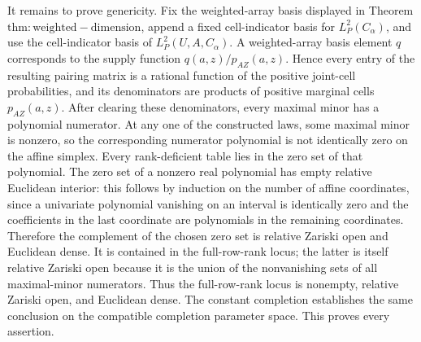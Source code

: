 It remains to prove genericity. Fix the weighted-array basis displayed in Theorem \(\mathrm{thm:weighted-dimension}\), append a fixed cell-indicator basis for \(L_P^2(C_\alpha)\), and use the cell-indicator basis of \(L_P^2(U,A,C_\alpha)\). A weighted-array basis element \(q\) corresponds to the supply function \(q(a,z)/p_{AZ}(a,z)\). Hence every entry of the resulting pairing matrix is a rational function of the positive joint-cell probabilities, and its denominators are products of positive marginal cells \(p_{AZ}(a,z)\). After clearing these denominators, every maximal minor has a polynomial numerator. At any one of the constructed laws, some maximal minor is nonzero, so the corresponding numerator polynomial is not identically zero on the affine simplex. Every rank-deficient table lies in the zero set of that polynomial. The zero set of a nonzero real polynomial has empty relative Euclidean interior: this follows by induction on the number of affine coordinates, since a univariate polynomial vanishing on an interval is identically zero and the coefficients in the last coordinate are polynomials in the remaining coordinates. Therefore the complement of the chosen zero set is relative Zariski open and Euclidean dense. It is contained in the full-row-rank locus; the latter is itself relative Zariski open because it is the union of the nonvanishing sets of all maximal-minor numerators. Thus the full-row-rank locus is nonempty, relative Zariski open, and Euclidean dense. The constant completion establishes the same conclusion on the compatible completion parameter space. This proves every assertion.